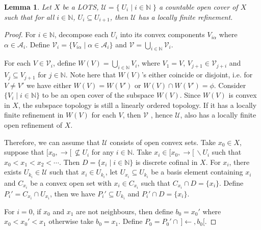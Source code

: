 \documentclass[12pt,oneside,english]{amsbook}
\numberwithin{equation}{section} %
\numberwithin{figure}{section} %
\theoremstyle{plain}
\numberwithin{section}{chapter}
\theoremstyle{plain}
\newtheorem{lem}[thm]{Lemma}
\begin{document}
\begin{lem}\label{paracompact:go:1}
  Let $X$ be a LOTS, $\mathcal{U} = \{ \; U_i \; | \; i \in \mathbb{N} \; \}$ a countable open cover of $X$ such that for all $i \in \mathbb{N}$, $U_i \subseteq U_{i+1}$, then $\mathcal{U}$ has a locally finite refinement.
\end{lem}
\begin{proof}
  For $i \in \mathbb{N}$, decompose each $U_{i}$ into its convex components $V_{i \alpha}$ where $\alpha \in \mathcal{A}_{i}$. Define $\mathcal{V}_{i} = \{V_{i\alpha} \; | \; \alpha \in \mathcal{A}_{i} \}$ and $\mathcal{V} = \bigcup_{i \in \mathbb{N}}\mathcal{V}_{i}$.

  For each $V \in \mathcal{V}_{i}$, define $W(V) = \bigcup_{i \in \mathbb{N}} V_{i}$, where $V_1 = V$, $V_{j+1} \in \mathcal{V}_{j + i}$ and $V_{j} \subseteq V_{j + 1}$ for $j \in \mathbb{N}$. Note here that $W(V)$'s either coincide or disjoint, i.e. for $V \neq V'$ we have either $W(V) = W(V')$ or $W(V) \cap W(V') = \phi$. Consider $\{V_{i} \; | \; i \in \mathbb{N} \}$ to be an open cover of the subspace $W(V)$. Since $W(V)$ is convex in $X$, the subspace topology is still a linearly ordered topology. If it has a locally finite refinement in $W(V)$ for each $V$, then $\mathcal{V}$ , hence $\mathcal{U}$, also has a locally finite open refinement of $X$.

  Therefore, we can assume that $\mathcal{U}$ consists of open convex sets. Take $x_{0} \in X$, suppose that $[x_{0}, \rightarrow [ \, \nsubseteq U_{i}$ for any $i \in \mathbb{N}$. Take $x_{i} \in [x_{0},\rightarrow[ \, \backslash U_{i}$ such that $x_{0} < x_{1} < x_{2} < \cdots$. Then $D = \{ x_{i} \; | \; i \in \mathbb{N} \}$ is discrete cofinal in $X$. For $x_i$, there exists $U_{k_i} \in \mathcal{U}$ such that $x_i \in U_{k_i}$, let $U_{x_{i}} \subseteq U_{k_i}$ be a basis element containing $x_{i}$ and $C_{x_i}$ be a convex open set with $x_i \in C_{x_i}$ such that $C_{x_i} \cap D = \{x_{i}\}$. Define $P_{i}' = C_{x_i} \cap U_{x_i}$, then we have $P_{i}' \subseteq U_{k_i}$ and $P_{i}' \cap D = \{ x_{i}\}$.

  For $i = 0$, if $x_0$ and $x_1$ are not neighbours, then define $b_{0} =  x_{0}'$  where $x_0 < x_{0}' < x_1$ otherwise take $b_{0} = x_{1}$. Define $P_{0} = P_{0}' \cap \, ]\leftarrow, b_{0}[$.


\end{proof}
\end{document}
